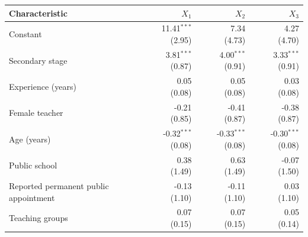 \begin{tabular}{p{5.6cm}rrr}
\toprule
Characteristic & $X_1$ & $X_2$ & $X_3$ \\
\midrule
Constant & \shortstack{11.41$^{***}$\\{\scriptsize (2.95)}} & \shortstack{7.34\\{\scriptsize (4.73)}} & \shortstack{4.27\\{\scriptsize (4.70)}} \\
Secondary stage & \shortstack{3.81$^{***}$\\{\scriptsize (0.87)}} & \shortstack{4.00$^{***}$\\{\scriptsize (0.91)}} & \shortstack{3.33$^{***}$\\{\scriptsize (0.91)}} \\
Experience (years) & \shortstack{0.05\\{\scriptsize (0.08)}} & \shortstack{0.05\\{\scriptsize (0.08)}} & \shortstack{0.03\\{\scriptsize (0.08)}} \\
Female teacher & \shortstack{-0.21\\{\scriptsize (0.85)}} & \shortstack{-0.41\\{\scriptsize (0.87)}} & \shortstack{-0.38\\{\scriptsize (0.87)}} \\
Age (years) & \shortstack{-0.32$^{***}$\\{\scriptsize (0.08)}} & \shortstack{-0.33$^{***}$\\{\scriptsize (0.08)}} & \shortstack{-0.30$^{***}$\\{\scriptsize (0.08)}} \\
Public school & \shortstack{0.38\\{\scriptsize (1.49)}} & \shortstack{0.63\\{\scriptsize (1.49)}} & \shortstack{-0.07\\{\scriptsize (1.50)}} \\
Reported permanent public appointment & \shortstack{-0.13\\{\scriptsize (1.10)}} & \shortstack{-0.11\\{\scriptsize (1.10)}} & \shortstack{0.03\\{\scriptsize (1.10)}} \\
Teaching groups & \shortstack{0.07\\{\scriptsize (0.15)}} & \shortstack{0.07\\{\scriptsize (0.15)}} & \shortstack{0.05\\{\scriptsize (0.14)}} \\

\end{tabular}

